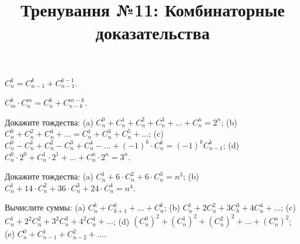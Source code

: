 



\title{Тренування №11: Комбинаторные доказательства}
\maketitle

\begin{problem}
	$C_n^k = C_{n-1}^k + C_{n-1}^{k-1}$.
\end{problem}

\begin{problem}
	$C_m^k \cdot C_n^m = C_n^k + C_{n-k}^{m-k}$.
\end{problem}

\begin{problem}
	Докажите тождества: (a) $C_n^0 + C_n^1 + C_n^2 + C_n^3 + \ldots + C_n^n = 2^n$; \medskip (b) $C_n^0 + C_n^2 + C_n^4 + \ldots = C_n^1 + C_n^3 + C_n^5 + \ldots$; \medskip (c) $C_n^0 - C_n^1 + C_n^2 - C_n^3 + C_n^4 - \ldots + (-1)^k \cdot C_n^k = (-1)^k C_{n-1}^k$; \medskip (d) $C_n^0 \cdot 2^0 + C_n^1 \cdot 2^1 + \ldots + C_n^n \cdot 2^n = 3^n$.
\end{problem}

\begin{problem}
	Докажите тождества: (a) $C_n^1 + 6 \cdot C_n^2 + 6 \cdot C_n^3 = n^3$; \medskip (b) $C_n^1 + 14 \cdot C_n^2 + 36 \cdot C_n^3 + 24 \cdot C_n^4 = n^4$.
\end{problem}

\begin{problem}
	Вычислите суммы: (a) $C_n^k + C_{k+1}^k + \ldots + C_n^k$; \medskip (b) $C_n^1 + 2 C_n^2 + 3 C_b^3 + 4 C_n^4 + \ldots$; \medskip (c) $C_n^1 + 2^2 C_n^2 + 3^2 C_n^3 + 4^2 C_n^4 + \ldots$; \medskip (d) $(C_n^0)^2 + (C_n^1)^2 + (C_n^2)^2 + \ldots + (C_n^n)^2$; \medskip (e) $C_n^0 + C_{n-1}^1 + C_{n-2}^2 + \ldots$.
\end{problem}

